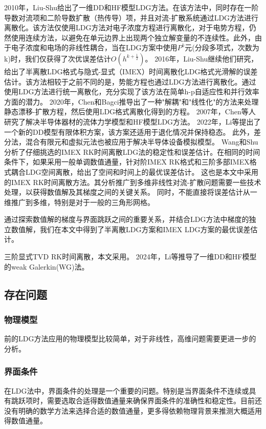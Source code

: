 2010年，Liu-Shu给出了一维DD和HF模型LDG方法\cite{liu2010error}。在该方法中，同时存在一阶导数对流项和二阶导数扩散（热传导）项，并且对流-扩散系统通过LDG方法进行离散化。该方法仅使用LDG方法对电子浓度方程进行离散化，对于电势方程，仍然使用连续方法，以避免在单元边界上出现两个独立解变量的不连续性。此外，由于电子浓度和电场的非线性耦合，当在LDG方案中使用$P^k$元(分段多项式，次数为k)时，我们仅获得了次优误差估计$O(h^{k+\frac{1}{2}})$。
2016年，Liu-Shu继续他们研究，给出了半离散LDG格式与隐式-显式（IMEX）时间离散化LDG格式光滑解的误差估计\cite{liu2016analysis}。该方法相较于之前不同的是，势能方程也通过LDG方法进行离散化。通过使用LDG方法进行统一离散化，充分实现了该方法在简单h-p自适应性和并行效率方面的潜力。
2020年，Chen和Bagci推导出了一种"解耦"和"线性化"的方法来处理静态漂移-扩散方程，然后使用LDG格式离散化得到的方程\cite{chen2020steady}。
2007年，Chen等人研究了解决半导体器材的流体力学模型和HF模型LDG方法\cite{chen2007discontinuous}。
2022年，Li等提出了一个新的DD模型有限体积方案，该方案还适用于退化情况并保持稳态\cite{li2022stabilized}。
此外，差分法\cite{ding2019optimal}，混合有限元\cite{gao2018linearized}和虚拟元法\cite{liu2021virtual}也被应用于解决半导体设备模拟模型。
Wang和Shu分析了仔细挑选的IMEX RK时间离散LDG法的稳定性和误差估计\cite{wang2015stability,wang2016stability}。在相同的时间条件下，如果采用一般单调数值通量，针对阶IMEX RK格式和三阶多部IMEX格式耦合LDG空间离散，给出了空间和时间上的最优误差估计。
这也是本文中采用的IMEX RK时间离散方法。其分析推广到多维非线性对流-扩散问题需要一些技术处理，以获得数值解及其梯度之间的关键关系。
同时，不能直接将误差估计从一维推广到多维，特别是对于一般的三角形网格。

通过探索数值解的梯度与界面跳跃之间的重要关系，并结合LDG方法中梯度的独立数值解，我们在本文中得到了半离散LDG方案和IMEX LDG方案的最优误差估计。

三阶显式TVD RK时间离散\cite{shu1988efficient}，本文采用。
2024年，Li等推导了一维DD和HF模型的weak Galerkin(WG)法\cite{li2024weak}。

\subsection{存在问题}
\subsubsection{物理模型}
前的LDG方法应用的物理模型比较简单，对于非线性，高维问题需要更进一步的分析。
\subsubsection{界面条件}
在LDG法中，界面条件的处理是一个重要的问题。特别是当界面条件不连续或具有跳跃项时，需要选取合适得数值通量来确保界面条件的准确性和稳定性。目前还没有明确的数学方法来选择合适的数值通量，更多得依赖物理背景来推测大概适用得数值通量。
